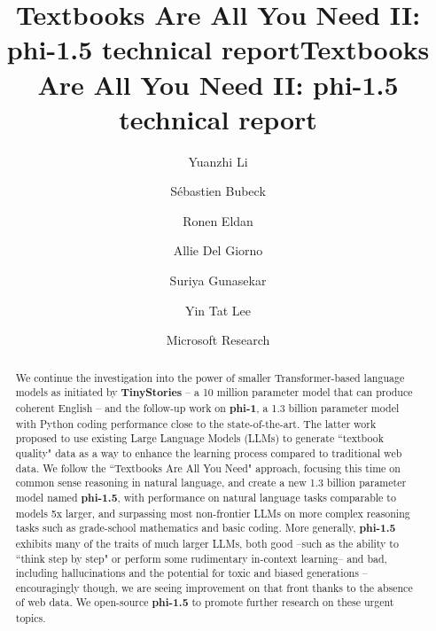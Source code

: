 \title{Textbooks Are All You Need II: phi-1.5 technical report}



\title{Textbooks Are All You Need II: \textbf{phi-1.5} technical report}

\author{Yuanzhi Li \and S\'ebastien Bubeck  \and Ronen Eldan \and Allie Del Giorno \and  Suriya Gunasekar \and Yin Tat Lee}

\date{Microsoft Research}

\maketitle

\begin{abstract}
We continue the investigation into the power of smaller Transformer-based language models as initiated by \textbf{TinyStories} -- a 10 million parameter model that can produce coherent English -- and the follow-up work on \textbf{phi-1}, a 1.3 billion parameter model with Python coding performance close to the state-of-the-art. The latter work proposed to use existing Large Language Models (LLMs) to generate ``textbook quality" data as a way to enhance the learning process compared to traditional web data. We follow the ``Textbooks Are All You Need" approach, focusing this time on common sense reasoning in natural language, and create a new 1.3 billion parameter model named \textbf{phi-1.5}, with performance on natural language tasks comparable to models 5x larger, and surpassing most non-frontier LLMs on more complex reasoning tasks such as grade-school mathematics and basic coding. More generally, \textbf{phi-1.5} exhibits many of the traits of much larger LLMs, both good --such as the ability to ``think step by step" or perform some rudimentary in-context learning-- and bad, including hallucinations and the potential for toxic and biased generations --encouragingly though, we are seeing improvement on that front thanks to the absence of web data. We open-source \textbf{phi-1.5} to promote further research on these urgent topics.
\end{abstract}

